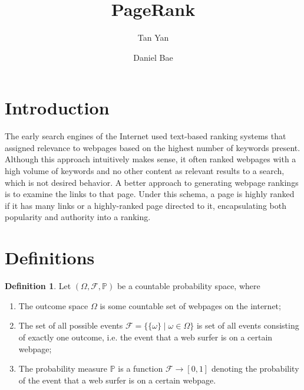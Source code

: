 \documentclass[11pt]{article}
\title{PageRank}
\author{Tan Yan \and Daniel Bae}
\theoremstyle{definition}
\newtheorem{definition}[theorem]{Definition}
\begin{document}
\maketitle

\section{Introduction}
The early search engines of the Internet used text-based ranking systems that assigned relevance to webpages based on the highest number of keywords present. 
Although this approach intuitively makes sense, it often ranked webpages with a high volume of keywords and no other content as relevant results to a search, which is not desired behavior.
A better approach to generating webpage rankings is to examine the links to that page.
Under this schema, a page is highly ranked if it has many links or a highly-ranked page directed to it, encapsulating both popularity and authority into a ranking.

\section{Definitions}
\begin{definition}
    Let $(\Omega, \mathcal{F}, \mathbb{P})$ be a countable probability space, where
    \begin{enumerate}
        \item The outcome space $\Omega$ is some countable set of webpages on the internet;
        \item The set of all possible events $\mathcal{F} = \{ \{\omega\} \mid \omega \in \Omega \}$ is set of all events consisting of exactly one outcome, i.e. the event that a web surfer is on a certain webpage;
        \item The probability measure $\mathbb{P}$ is a function $\mathcal{F} \to [0,1]$ denoting the probability of the event that a web surfer is on a certain webpage.
    \end{enumerate}
\end{definition}
\end{document}

